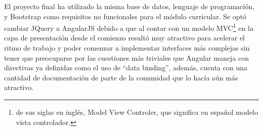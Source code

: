El proyecto final ha utilizado la misma base de datos, lenguaje de programación, y Bootstrap como requisitos no funcionales para el módulo curricular. Se optó cambiar JQuery a AngularJS debido a que al contar con un modelo MVC\footnote{de sus siglas en inglés, Model View Controler, que significa en español modelo vista controlador.} en la capa de presentación desde el comienzo resultó muy atractivo para acelerar el ritmo de trabajo y poder comenzar a implementar interfaces más complejas sin tener que preocuparse por las cuestiones más triviales que Angular maneja con directivas ya definidas como el uso de \enquote{data binding}, además, cuenta con una cantidad de documentación de parte de la comunidad que lo hacía aún más atractivo.